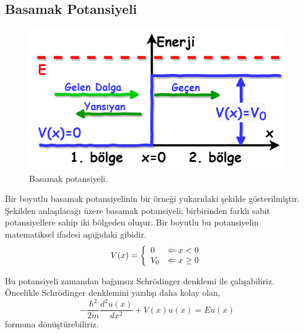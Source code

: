 \documentclass[a4paper,12pt, twoside]{article}
\begin{document}
\subsection{Basamak Potansiyeli}
\begin{figure}[hbtp]
	\centering
	\includegraphics[width=0.6\linewidth]{figurler/Basamak_Potansiyeli.png}
	\caption{Basamak potansiyeli.}
	\label{fig:basamakpotansiyeli}
\end{figure}
Bir boyutlu basamak potansiyelinin bir örneği yukarıdaki şekilde gösterilmiştir. Şekilden anlaşılacağı üzere basamak potansiyeli; birbirinden farklı sabit potansiyellere sahip iki bölgeden oluşur. Bir boyutlu bu potansiyelin matematiksel ifadesi aşağıdaki gibidir.
\begin{align}
V ( x )  = \left\{ 
\begin{array} { l l } 
{ 0 } & {\Leftarrow x < 0 } \\ 
{ V _ { 0 } } & {\Leftarrow x \geq 0 } 
\end{array} \right. 
\end{align}

Bu potansiyeli zamandan bağımsız Schrödinger denklemi ile çalışabiliriz. Öncelikle Schrödinger denklemini yazılışı daha kolay olan,
\begin{equation}
- \frac { \hbar ^ { 2 } } { 2 m } \frac { d ^ { 2 } u ( x ) } { d x ^ { 2 } } + V ( x ) u ( x ) = E u ( x )
\end{equation}
formuna dönüştürebiliriz.
\end{document}
